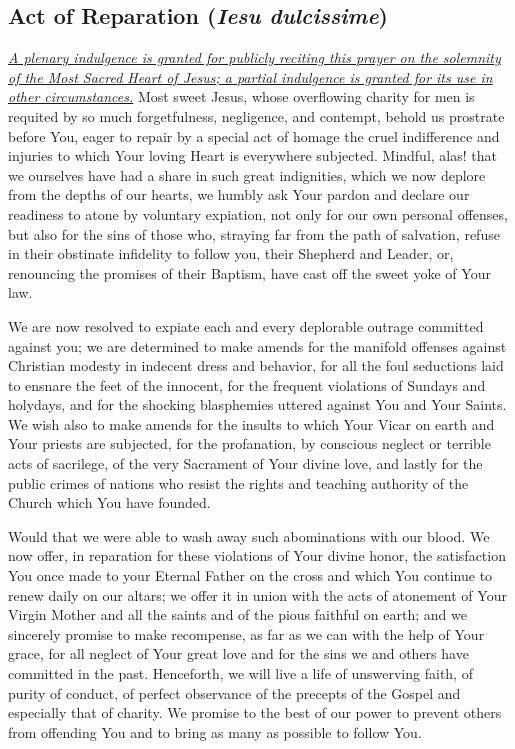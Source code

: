 \documentclass[12pt]{article}
\newcommand{\prayertitle}[1]{\subsection{#1}}
\newcommand{\indulgencedprayertitle}[1]{\prayertitle{#1 \protect\kreuz}}
\newcommand{\foreign}[1]{\textsl{#1}}
\newcommand{\note}[1]{{\small{\textsl{#1}}}\newline}
\newcommand{\linkednote}[2]{\hyperlink{#1}{\note{#2}}}
\begin{document}
\indulgencedprayertitle{Act of Reparation (\foreign{Iesu dulcissime})}
\linkednote{grant3}{A plenary indulgence is granted for publicly reciting this prayer on the solemnity of the Most Sacred Heart of Jesus;
a partial indulgence is granted for its use in other circumstances.}
Most sweet Jesus, whose overflowing charity for men is requited by so much forgetfulness, negligence, and contempt, behold us prostrate before You, eager to repair by a special act of homage the cruel indifference and injuries to which Your loving Heart is everywhere subjected.
Mindful, alas! that we ourselves have had a share in such great indignities, which we now deplore from the depths of our hearts, we humbly ask Your pardon and declare our readiness to atone by voluntary expiation, not only for our own personal offenses, but also for the sins of those who, straying far from the path of salvation, refuse in their obstinate infidelity to follow you, their Shepherd and Leader, or, renouncing the promises of their Baptism, have cast off the sweet yoke of Your law.

We are now resolved to expiate each and every deplorable outrage committed against you; we are determined to make amends for the manifold offenses against Christian modesty in indecent dress and behavior, for all the foul seductions laid to ensnare the feet of the innocent, for the frequent violations of Sundays and holydays, and for the shocking blasphemies uttered against You and Your Saints.
We wish also to make amends for the insults to which Your Vicar on earth and Your priests are subjected, for the profanation, by conscious neglect or terrible acts of sacrilege, of the very Sacrament of Your divine love, and lastly for the public crimes of nations who
resist the rights and teaching authority of the Church which You have founded.

Would that we were able to wash away such abominations with our blood.
We now offer, in reparation for these violations of Your divine honor, the satisfaction You once made to your Eternal Father on the cross and which You continue to renew daily on our altars;
we offer it in union with the acts of atonement of Your Virgin Mother and all the saints and of the pious faithful on earth;
and we sincerely promise to make recompense, as far as we can with the help of Your grace, for all neglect of Your great love and for the sins we and others have committed in the past.
Henceforth, we will live a life of unswerving faith, of purity of conduct, of perfect observance of the precepts of the Gospel and especially that of charity.
We promise to the best of our power to prevent others from offending You and to bring as many as possible to follow You.
\end{document}
